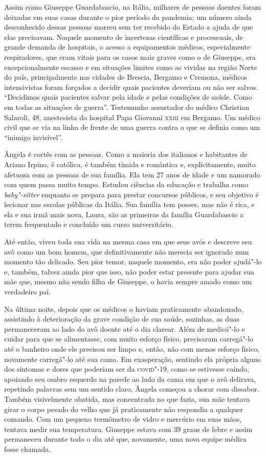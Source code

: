 Assim como Giuseppe Guardabascio, na Itália, milhares de pessoas doentes
foram deixadas em suas casas durante o pior período da pandemia; um
número ainda desconhecido dessas pessoas morreu sem ter recebido do
Estado a ajuda de que elas precisavam. Naquele momento de incertezas
científicas e processuais, de grande demanda de hospitais, o acesso a
equipamentos médicos, especialmente respiradores, que eram vitais para
os casos mais graves como o de Giuseppe, era excepcionalmente escasso e
em situações limites como as vividas na região Norte do país,
principalmente nas cidades de Brescia, Bergamo e Cremona, médicos
intensivistas foram forçados a decidir quais pacientes deveriam ou não
ser salvos. ``Decidimos quais pacientes salvar pela idade e pelas
condições de saúde. Como em todas as situações de guerra''. Testemunho
assustador do médico Christian Salaroli, 48, anestesista do hospital
Papa Giovanni \textsc{xxiii} em Bergamo. Um médico civil que se via na linha de
frente de uma guerra contra o que se definia como um ``inimigo
invisível''.

Ângela é cortês com as pessoas. Como a maioria dos italianos e
habitantes de Ariano Irpino, é católica, é também tímida e romântica e,
explicitamente, muito afetuosa com as pessoas de sua família. Ela tem 27
anos de idade e um namorado com quem passa muito tempo. Estudou ciências
da educação e trabalha como \emph{baby"-sitter} enquanto se prepara para
prestar concursos públicos, e seu objetivo é lecionar nas escolas
públicas da Itália. Sua família tem posses, mas não é rica, e ela e sua
irmã mais nova, Laura, são as primeiras da família Guardabascio a terem
frequentado e concluído um curso universitário.

Até então, viveu toda sua vida na mesma casa em que seus avós e descreve
seu avô como um bom homem, que definitivamente não merecia ser ignorado
num momento tão delicado. Seu pior temor, naquele momento, era não poder
ajudá"-lo e, também, talvez ainda pior que isso, não poder estar presente
para ajudar sua mãe que, mesmo não sendo filha de Giuseppe, o havia
sempre amado como um verdadeiro pai.

Na última noite, depois que os médicos o haviam praticamente abandonado,
assistindo à deterioração da grave condição de sua saúde, sozinhas, as
duas permaneceram ao lado do avô doente até o dia clarear. Além de
medicá"-lo e cuidar para que se alimentasse, com muito esforço físico,
precisaram carregá"-lo até o banheiro onde ele precisou ser limpo e,
então, não com menos esforço físico, novamente carregá"-lo até sua cama.
Em exasperação, sentindo ela própria alguns dos sintomas e dores que
poderiam ser da \textsc{covid}"-19, como se estivesse caindo, apoiando seu ombro
esquerdo na parede ao lado da cama em que o avô delirava, repetindo
palavras sem um sentido claro, Ângela começou a chorar com dissabor.
Também visivelmente abatida, mas concentrada no que fazia, sua mãe
tentava girar o corpo pesado do velho que já praticamente não respondia
a qualquer comando. Com um pequeno termômetro de vidro e mercúrio em
suas mãos, tentava medir sua temperatura. Giuseppe estava com 39 graus
de febre e assim permaneceu durante todo o dia até que, novamente, uma
nova equipe médica fosse chamada.

